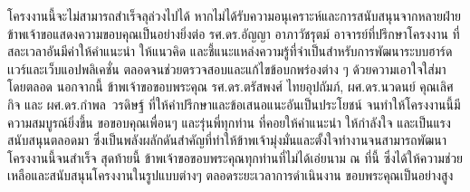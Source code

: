 %

\begin{acknowledgments}

โครงงานนี้จะไม่สามารถสําเร็จลุล่วงไปได้ หากไม่ได้รับความอนุเคราะห์และการสนับสนุนจากหลายฝ่าย ข้าพเจ้าขอแสดงความขอบคุณเป็นอย่างยิ่งต่อ รศ.ดร.อัญญา อาภาวัชรุตม์ อาจารย์ที่ปรึกษาโครงงาน ที่สละเวลาอันมีค่าให้คําแนะนํา ให้แนวคิด และชี้แนะแหล่งความรู้ที่จําเป็นสําหรับการพัฒนาระบบฮาร์ดเเวร์และเว็บแอปพลิเคชั่น ตลอดจนช่วยตรวจสอบและแก้ไขข้อบกพร่องต่าง ๆ ด้วยความเอาใจใส่มาโดยตลอด นอกจากนี้ ข้าพเจ้าขอขอบพระคุณ รศ.ดร.ตรัสพงศ์ ไทยอุปถัมภ์, ผศ.ดร.นวดนย์ คุณเลิศกิจ และ \mbox{ผศ.ดร.กำพล วรดิษฐ์} ที่ให้คําปรึกษาและข้อเสนอแนะอันเป็นประโยชน์ จนทําให้โครงงานนี้มีความสมบูรณ์ยิ่งขึ้น ขอขอบคุณเพื่อนๆ และรุ่นพี่ทุกท่าน ที่คอยให้คําแนะนํา ให้กําลังใจ และเป็นแรงสนับสนุนตลอดมา ซึ่งเป็นพลังผลักดันสําคัญที่ทําให้ข้าพเจ้ามุ่งมั่นและตั้งใจทํางานจนสามารถพัฒนาโครงงานนี้จนสําเร็จ สุดท้ายนี้ ข้าพเจ้าขอขอบพระคุณทุกท่านที่ไม่ได้เอ่ยนาม ณ ที่นี้ ซึ่งได้ให้ความช่วยเหลือและสนับสนุนโครงงานในรูปแบบต่างๆ ตลอดระยะเวลาการดําเนินงาน ขอบพระคุณเป็นอย่างสูง
\\

\end{acknowledgments}%
\fi %

\contentspage

\ifproject
\figurelistpage

\tablelistpage
\fi %



